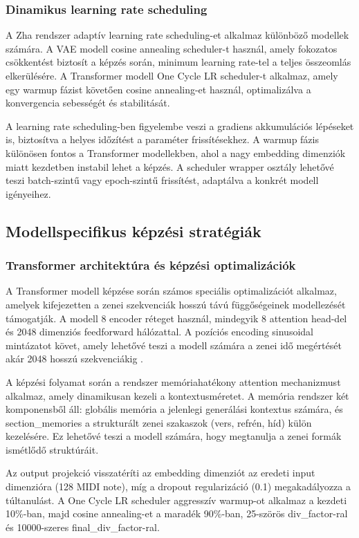 \subsubsection{Dinamikus learning rate scheduling}
A Zha rendszer adaptív learning rate scheduling-et alkalmaz különböző modellek számára. A VAE modell cosine annealing scheduler-t használ, amely fokozatos csökkentést biztosít a képzés során, minimum learning rate-tel a teljes összeomlás elkerülésére. A Transformer modell One Cycle LR scheduler-t alkalmaz, amely egy warmup fázist követően cosine annealing-et használ, optimalizálva a konvergencia sebességét és stabilitását.

A learning rate scheduling-ben figyelembe veszi a gradiens akkumulációs lépéseket is, biztosítva a helyes időzítést a paraméter frissítésekhez. A warmup fázis különösen fontos a Transformer modellekben, ahol a nagy embedding dimenziók miatt kezdetben instabil lehet a képzés. A scheduler wrapper osztály lehetővé teszi batch-szintű vagy epoch-szintű frissítést, adaptálva a konkrét modell igényeihez.

\subsection{Modellspecifikus képzési stratégiák}

\subsubsection{Transformer architektúra és képzési optimalizációk}
A Transformer modell képzése során számos speciális optimalizációt alkalmaz, amelyek kifejezetten a zenei szekvenciák hosszú távú függőségeinek modellezését támogatják. A modell 8 encoder réteget használ, mindegyik 8 attention head-del és 2048 dimenziós feedforward hálózattal. A pozíciós encoding sinusoidal mintázatot követ, amely lehetővé teszi a modell számára a zenei idő megértését akár 2048 hosszú szekvenciákig \cite{huang2018music}.

A képzési folyamat során a rendszer memóriahatékony attention mechanizmust alkalmaz, amely dinamikusan kezeli a kontextusméretet. A memória rendszer két komponensből áll: globális memória a jelenlegi generálási kontextus számára, és section_memories a strukturált zenei szakaszok (vers, refrén, híd) külön kezelésére. Ez lehetővé teszi a modell számára, hogy megtanulja a zenei formák ismétlődő struktúráit.

Az output projekció visszatéríti az embedding dimenziót az eredeti input dimenzióra (128 MIDI note), míg a dropout regularizáció (0.1) megakadályozza a túltanulást. A One Cycle LR scheduler aggresszív warmup-ot alkalmaz a kezdeti 10\%-ban, majd cosine annealing-et a maradék 90\%-ban, 25-szörös div_factor-ral és 10000-szeres final_div_factor-ral.

